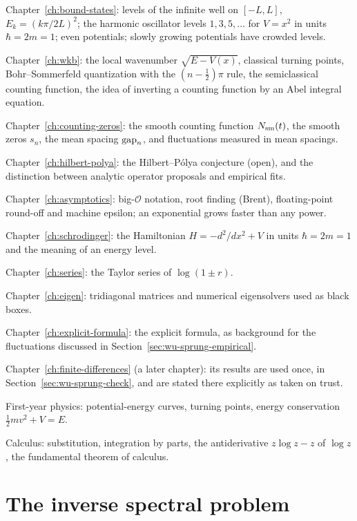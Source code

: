 \begin{prerequisites}
\item Chapter~\ref{ch:bound-states}: levels of the infinite well on $[-L,L]$, $E_k=(k\pi/2L)^2$; the harmonic oscillator levels $1,3,5,\dots$ for $V=x^2$ in units $\hbar=2m=1$; even potentials; slowly growing potentials have crowded levels.
\item Chapter~\ref{ch:wkb}: the local wavenumber $\sqrt{E-V(x)}$, classical turning points, Bohr--Sommerfeld quantization with the $(n-\tfrac12)\pi$ rule, the semiclassical counting function, the idea of inverting a counting function by an Abel integral equation.
\item Chapter~\ref{ch:counting-zeros}: the smooth counting function $N_{\mathrm{sm}}(t)$, the smooth zeros $s_n$, the mean spacing $\mathrm{gap}_n$, and fluctuations measured in mean spacings.
\item Chapter~\ref{ch:hilbert-polya}: the Hilbert--P\'olya conjecture (open), and the distinction between analytic operator proposals and empirical fits.
\item Chapter~\ref{ch:asymptotics}: big-$\mathcal O$ notation, root finding (Brent), floating-point round-off and machine epsilon; an exponential grows faster than any power.
\item Chapter~\ref{ch:schrodinger}: the Hamiltonian $H=-d^2/dx^2+V$ in units $\hbar=2m=1$ and the meaning of an energy level.
\item Chapter~\ref{ch:series}: the Taylor series of $\log(1\pm r)$.
\item Chapter~\ref{ch:eigen}: tridiagonal matrices and numerical eigensolvers used as black boxes.
\item Chapter~\ref{ch:explicit-formula}: the explicit formula, as background for the fluctuations discussed in Section~\ref{sec:wu-sprung-empirical}.
\item Chapter~\ref{ch:finite-differences} (a later chapter): its results are used once, in Section~\ref{sec:wu-sprung-check}, and are stated there explicitly as taken on trust.
\item First-year physics: potential-energy curves, turning points, energy conservation $\tfrac12 mv^2+V=E$.
\item Calculus: substitution, integration by parts, the antiderivative $z\log z-z$ of $\log z$, the fundamental theorem of calculus.
\end{prerequisites}

\section{The inverse spectral problem}\label{sec:wu-sprung-inverse}


